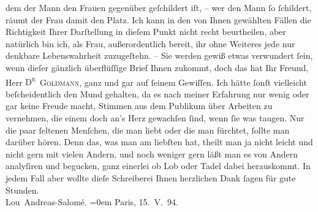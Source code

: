 \begin{ledgroupsized}[t]{13cm}
               dem der Mann den Frauen gegenüber geſchildert iſt, {\pb}– wer den Mann ſo ſchildert, räumt der
               Frau damit den Platz. Ich kann in den von Ihnen gewählten Fällen die Richtigkeit
               Ihrer Darſtellung in dieſem Punkt nicht recht beurtheilen, aber natürlich bin ich,
               als Frau, außerordentlich bereit, ihr ohne Weiteres jede nur denkbare Lebenswahrheit
               zuzugeſtehn. –\pend
           \pstart
           Sie werden gewiß etwas verwundert ſein, wenn dieſer gänzlich überflüſſige Brief Ihnen
               zukommt, doch das hat Ihr Freund, Herr \textsc{D\textsuperscript{r} }\textsc{Goldmann}, ganz und gar auf ſeinem Gewiſſen. Ich hätte ſonſt vielleicht beſcheidentlich
               den Mund gehalten, da es nach meiner Erfahrung nur wenig oder gar keine Freude macht,
               Stimmen aus dem Publikum über Arbeiten zu vernehmen, die einem doch an's Herz
               gewachſen ſind, wenn ſie was taugen. Nur die paar ſeltenen Menſchen, die man liebt
               oder die man fürchtet, ſollte man darüber hören. Denn das, was man am liebſten hat,
               theilt man ja {\pb}nicht leicht und nicht gern
               mit vielen Andern, und noch weniger gern läßt man es von Andern analyſiren und
               begucken, ganz einerlei ob Lob oder Tadel dabei herauskommt.\pend
           \pstart
           In jedem Fall aber wollte dieſe Schreiberei Ihnen herzlichen Dank ſagen für gute Stunden.{\\[\baselineskip]}\spacefill\mbox{Lou Andreas-Salomé.}\pend
           \leftskip=0em{}\pstart
           Paris, 15. V. 94. \pend
           
         
         \endnumbering{}\end{ledgroupsized}  \newcommand{\dateiname}{L00325}\newcommand{\titel}{Lou Andreas-Salomé an Arthur Schnitzler, 15. 5. 1894}\newcommand{\editorInnen}{Martin Anton Müller und Gerd-Hermann Susen}
      